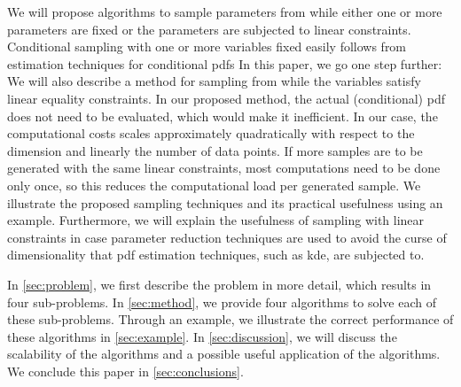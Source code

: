 We will propose algorithms to sample parameters from  while either one or more parameters are fixed or the parameters are subjected to linear constraints.
Conditional sampling with one or more variables fixed easily follows from estimation techniques for conditional \acp{pdf} \autocite{hyndman1996estimating, holmes2007fast}
In this paper, we go one step further: We will also describe a method for sampling from  while the variables satisfy linear equality constraints. 
In our proposed method, the actual (conditional) \ac{pdf} does not need to be evaluated, which would make it inefficient.
In our case, the computational costs scales approximately quadratically with respect to the dimension and linearly the number of data points. 
If more samples are to be generated with the same linear constraints, most computations need to be done only once, so this reduces the computational load per generated sample.
We illustrate the proposed sampling techniques and its practical usefulness using an example.
Furthermore, we will explain the usefulness of sampling with linear constraints in case parameter reduction techniques are used to avoid the curse of dimensionality that \ac{pdf} estimation techniques, such as \ac{kde}, are subjected to.

In \cref{sec:problem}, we first describe the problem in more detail, which results in four sub-problems.
In \cref{sec:method}, we provide four algorithms to solve each of these sub-problems.
Through an example, we illustrate the correct performance of these algorithms in \cref{sec:example}.
In \cref{sec:discussion}, we will discuss the scalability of the algorithms and a possible useful application of the algorithms. 
We conclude this paper in \cref{sec:conclusions}.

